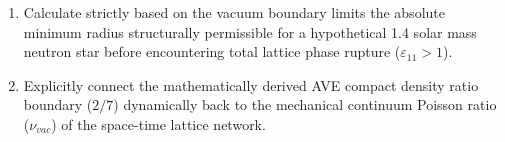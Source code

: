 \begin{exercisebox}
\begin{enumerate}
    \item Calculate strictly based on the vacuum boundary limits the absolute minimum radius structurally permissible for a hypothetical 1.4 solar mass neutron star before encountering total lattice phase rupture ($\varepsilon_{11} > 1$).
    \item Explicitly connect the mathematically derived AVE compact density ratio boundary ($2/7$) dynamically back to the mechanical continuum Poisson ratio ($\nu_{vac}$) of the space-time lattice network.
\end{enumerate}
\end{exercisebox}
%
%
